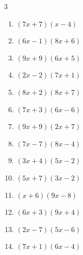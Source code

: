 \begin{multicols}{3}
\begin{enumerate}

  \item $(7x+7)(x-4)$


  \item $(6x-1)(8x+6)$


  \item $(9x+9)(6x+5)$


  \item $(2x-2)(7x+1)$


  \item $(8x+2)(8x+7)$


  \item $(7x+3)(6x-6)$


  \item $(9x+9)(2x+7)$


  \item $(7x-7)(8x-4)$


  \item $(3x+4)(5x-2)$


  \item $(5x+7)(3x-2)$


  \item $(x+6)(9x-8)$


  \item $(6x+3)(9x+4)$


  \item $(2x-7)(5x-6)$


  \item $(7x+1)(6x-4)$



\end{enumerate}
\end{multicols}
